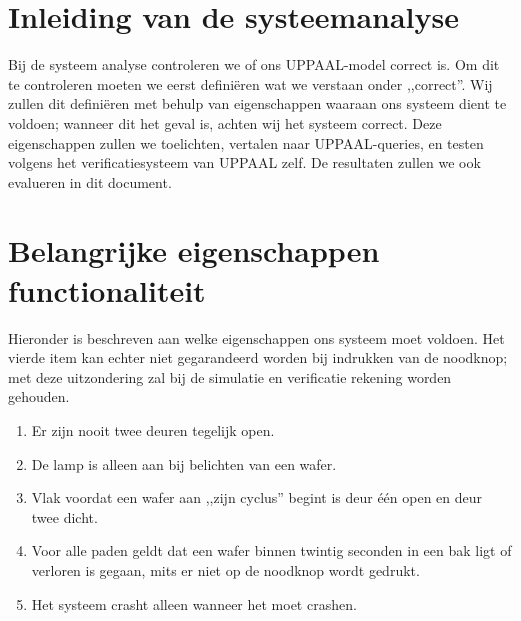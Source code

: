 

    \section{Inleiding van de systeemanalyse}
        Bij de systeem analyse controleren we of ons UPPAAL-model correct is. Om dit te controleren moeten
        we eerst defini\"eren wat we verstaan onder ,,correct''. Wij zullen dit defini\"eren met
        behulp van eigenschappen waaraan ons systeem dient te voldoen; wanneer dit het geval is, achten
        wij het systeem correct. Deze eigenschappen zullen we toelichten, vertalen naar UPPAAL-queries, en
        testen volgens het verificatiesysteem van UPPAAL zelf. De resultaten zullen we ook evalueren in dit
        document.


    \section{Belangrijke eigenschappen functionaliteit}
        Hieronder is beschreven aan welke eigenschappen ons systeem moet voldoen. Het vierde item kan echter niet
        gegarandeerd worden bij indrukken van de noodknop; met deze uitzondering zal bij de simulatie en verificatie
        rekening worden gehouden.
        \begin{enumerate}
            \item Er zijn nooit twee deuren tegelijk open.
            \item De lamp is alleen aan bij belichten van een wafer.
            \item Vlak voordat een wafer aan ,,zijn cyclus'' begint is deur \'{e}\'{e}n open en deur twee dicht.
            \item Voor alle paden geldt dat een wafer binnen twintig seconden in een bak ligt of verloren is gegaan, mits er niet
                  op de noodknop wordt gedrukt.
            \item Het systeem crasht alleen wanneer het moet crashen.
        \end{enumerate}

